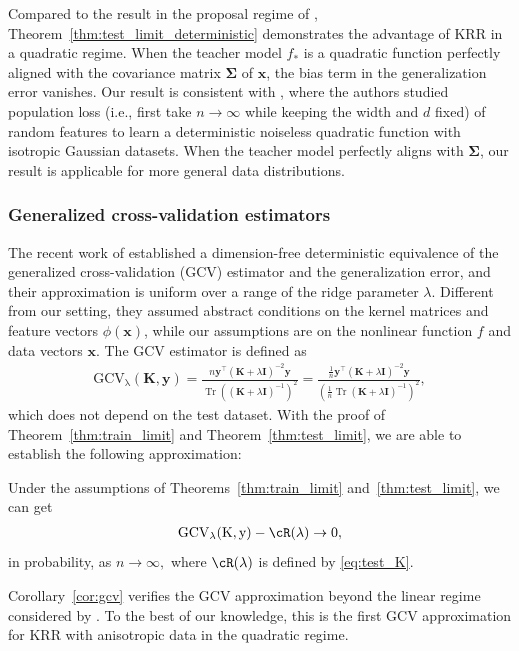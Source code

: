\documentclass[twoside,11pt]{article}
\newcommand{\by}{\boldsymbol{y}}
\def\bI{{\mathbf I}}
\def\bK{{\boldsymbol K}}
\def\bx{{\boldsymbol x}}
\def\by{{\boldsymbol y}}
\def\bSigma{{\boldsymbol \Sigma}}
\renewcommand{\bK}{\boldsymbol{K}}
\newcommand{\Tr}{\operatorname{Tr}}
\newcommand{\1}{\mathbf{1}}
\begin{document}
\begin{remark}
Compared to the result in the proposal regime of \citep{bartlett2021deep}, Theorem~\ref{thm:test_limit_deterministic} demonstrates the advantage of KRR in a quadratic regime. When the teacher model $f_*$ is a quadratic function perfectly aligned with the covariance matrix $\mathbf{\Sigma}$ of $\bx$, the bias term in the generalization error vanishes. Our result is consistent with \cite[Theorem 10]{ghorbani2019limitations}, where the authors studied population loss (i.e., first take $n\to\infty$ while keeping the width and $d$ fixed) of random features to learn a deterministic noiseless quadratic function with isotropic Gaussian datasets. 
When the teacher model perfectly aligns with $\bSigma$, our result is applicable for more general data distributions.

\end{remark}


\subsubsection{Generalized cross-validation estimators}
The recent work of \cite{misiakiewicz2024non} established a dimension-free deterministic equivalence of the generalized cross-validation (GCV) estimator and the generalization error, and their approximation is uniform over a range of the ridge parameter $\lambda$. Different from our setting, they assumed abstract conditions on the kernel matrices and feature vectors $\phi(\mathbf x)$, while our assumptions are on the nonlinear function $f$ and data vectors $\mathbf x$.
The GCV estimator \citep{hastie2022surprises,wei2022more} is defined as 
\begin{align}
    \mathrm{GCV_{\lambda}(\bK,\by)}=\frac{n\by^\top (\bK+\lambda \bI)^{-2} \by}{\Tr ((\bK+\lambda \bI)^{-1})^{2}} =\frac{\frac{1}{n}\by^\top (\bK+\lambda \bI)^{-2} \by}{(\frac{1}{n}\Tr (\bK+\lambda \bI)^{-1})^{2}},
\end{align}which does not depend on the test dataset.
With the proof of Theorem~\ref{thm:train_limit} and Theorem~\ref{thm:test_limit}, we are able to establish the following approximation:
\begin{corollary}\label{cor:gcv}
Under the assumptions of Theorems~\ref{thm:train_limit} and~\ref{thm:test_limit}, we can get 
\begin{align}
        \mathrm{GCV_{\lambda}(\bK,\by)}-\cR(\lambda)\to 0,
    \end{align}
in probability, as $n\to\infty,$ where $\cR(\lambda)$ is defined by \eqref{eq:test_K}.
\end{corollary}
Corollary~\ref{cor:gcv} verifies the GCV approximation beyond the linear regime considered by \cite{hastie2022surprises,wei2022more}. To the best of our knowledge, this is the first GCV approximation for KRR with anisotropic data in the quadratic regime.
\end{document}
